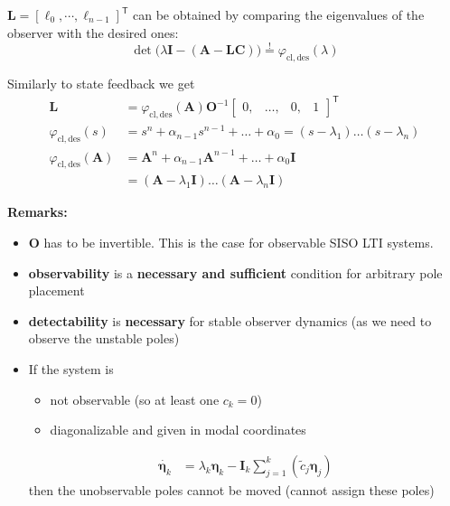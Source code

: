 $\mathbf{L}={\left[\ell_0,\cdots,\ell_{n-1}\right]}^{\mathsf{T}}$ can be obtained by comparing the eigenvalues of the observer with the desired ones:
\noindent\begin{equation*}
    \det\bigl(\lambda \mathbf{I} -(\mathbf{A}-\mathbf{LC})\bigr) \overset{!}{=} \varphi_{\mathrm{cl,des}}(\lambda)
\end{equation*}


Similarly to state feedback we get
\begin{align*}
    \mathbf{L}                            & =\varphi_{\mathrm{cl,des}}(\mathbf{A})\mathbf{O}^{-1}\begin{bmatrix}
                                                                                                     0, & \ldots, & 0, & 1
                                                                                                 \end{bmatrix}^{\mathsf{T}} \\
    \varphi_{\mathrm{cl,des}}(s)          & =s^n+\alpha_{n-1}s^{n-1}+\ldots+\alpha_0=(s-\lambda_1)\ldots(s-\lambda_n)       \\
    \varphi_{\mathrm{cl,des}}(\mathbf{A}) & =\mathbf{A}^n+\alpha_{n-1}\mathbf{A}^{n-1}+\ldots+\alpha_0 \mathbf{I}           \\
                                          & = (\mathbf{A}-\lambda_1 \mathbf{I})\ldots(\mathbf{A}-\lambda_n \mathbf{I})
\end{align*}

\textbf{Remarks:}
\begin{itemize}
    \item $\mathbf{O}$ has to be invertible. This is the case for observable SISO LTI systems.
    \item \textbf{observability} is a \textbf{necessary and sufficient} condition for arbitrary pole placement
    \item \textbf{detectability} is \textbf{necessary} for stable observer dynamics (as we need to observe the unstable poles)
    \item If the system is
          \begin{itemize}
              \item not observable (so at least one $c_k=0$)
              \item diagonalizable and given in modal coordinates
          \end{itemize}
          \begin{align*}
              \dot{\boldsymbol{\eta}_k} & =\lambda_k\boldsymbol{\eta}_k-\mathbf{I}_k\sum_{j=1}^k\left(\tilde{c}_j \boldsymbol{\eta}_j\right)
          \end{align*}
          then the unobservable poles cannot be moved (cannot assign these poles)
\end{itemize}

